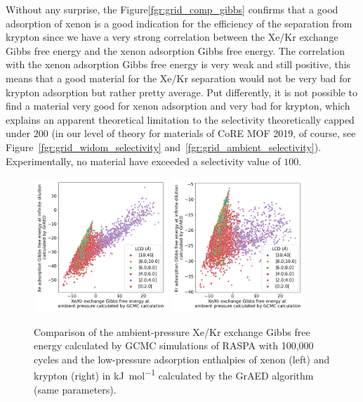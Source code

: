 \documentclass[main]{subfiles}
\begin{document}
Without any surprise, the Figure\ref{fgr:grid_comp_gibbs} confirms that a good adsorption of xenon is a good indication for the efficiency of the separation from krypton since we have a very strong correlation between the Xe/Kr exchange Gibbs free energy and the xenon adsorption Gibbs free energy. The correlation with the xenon adsorption Gibbs free energy is very weak and still positive, this means that a good material for the Xe/Kr separation would not be very bad for krypton adsorption but rather pretty average. Put differently, it is not possible to find a material very good for xenon adsorption and very bad for krypton, which explains an apparent theoretical limitation to the selectivity theoretically capped under $200$ (in our level of theory for materials of CoRE MOF 2019, of course, see Figure~\ref{fgr:grid_widom_selectivity} and~\ref{fgr:grid_ambient_selectivity}). Experimentally, no material have exceeded a selectivity value of $100$.

\begin{figure}[ht]
  \centering
    \includegraphics[width=0.45\textwidth]{figures/3-fastsim/G_2080_vs_H_Xe_grid_overview.jpg}
    \includegraphics[width=0.45\textwidth]{figures/3-fastsim/G_2080_vs_H_Kr_grid_overview.jpg}
    \caption{Comparison of the ambient-pressure Xe/Kr exchange Gibbs free energy calculated by GCMC simulations of RASPA with 100,000 cycles and the low-pressure adsorption enthalpies of xenon (left) and krypton (right) in \si{\kilo\joule\per\mole} calculated by the GrAED algorithm (same parameters).}\label{fgr:grid_comp_enthalpy}
\end{figure}
\end{document}
